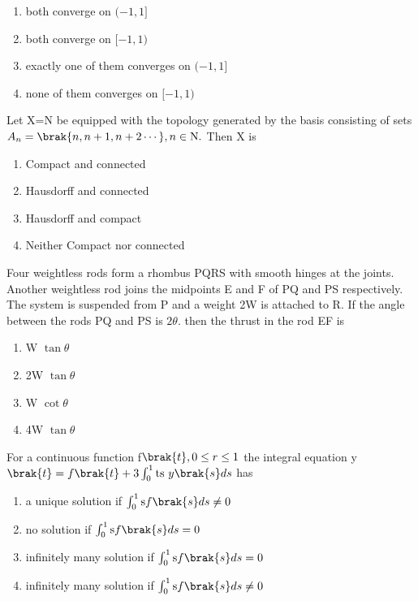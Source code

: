    \begin{enumerate}
        \item both converge on $(-1,1]$
        \item both converge on $[-1,1)$
        \item exactly one of them converges on $(-1,1]$
        \item none of them converges on $[-1,1)$
    \end{enumerate}
\bigskip 
\item Let X=N be equipped with the topology generated by the basis consisting of sets $A_{n}=\brak{n,n+1,n+2\cdots},n\in \text{N}.$ Then X is 
\begin{multicols}{2}
    \begin{enumerate}
        \item Compact and connected 
        \item Hausdorff and connected 
        \item Hausdorff and compact
        \item Neither Compact nor connected
    \end{enumerate}
\end{multicols}
\bigskip
\item Four weightless rods form a rhombus PQRS with smooth hinges at the joints. Another weightless rod joins the midpoints E and F of PQ and PS respectively. The system is suspended from P and a weight 2W is attached to R. If the angle between the rods PQ and PS is $2\theta$. then the thrust in the rod EF is
\begin{multicols}{4}
    \begin{enumerate}
        \item W $\tan\theta$
        \item 2W $\tan\theta$
        \item W $\cot\theta$
        \item 4W $\tan\theta$
    \end{enumerate}
\end{multicols}
\bigskip
\item For a continuous  function f$\brak{t},0\leq r \leq 1$ the integral equation y$\brak{t}=f\brak{t}+3\int_{0}^{1} \text{ts }  y\brak{s}ds$ has 

    \begin{enumerate}
        \item a unique solution if $\int_{0}^{1} \text{s}f\brak{s}ds \neq 0$
        \item no  solution if $\int_{0}^{1} \text{s}f\brak{s}ds=0$
        \item  infinitely many solution if $\int_{0}^{1} \text{s}f\brak{s}ds=0$
        \item infinitely many solution if $\int_{0}^{1} \text{s}f\brak{s}ds \neq 0$
    \end{enumerate}

